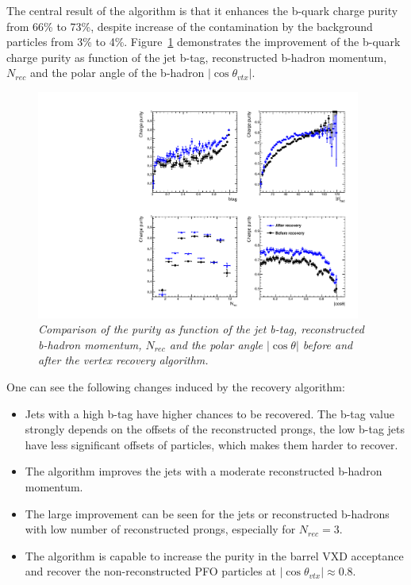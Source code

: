 The central result of the algorithm is that it enhances the b-quark charge purity from 66\% to 73\%, despite increase of the contamination by the  background particles from 3\% to 4\%.
Figure~\ref{fig:RecoveryPurityComparison_3} demonstrates the improvement of the b-quark charge purity as function of the jet b-tag, reconstructed b-hadron momentum, $N_{rec}$ and the polar angle of the b-hadron  $|\cos\theta_{vtx}|$.
\begin{figure}
{\centering
    \includegraphics[width=0.95\textwidth]{ILD/plots/recovery-purity-comparison.pdf}
    \caption{\sl Comparison of the purity as function of the jet b-tag, reconstructed b-hadron momentum, $N_{rec}$ and the polar angle $|\cos\theta|$ before and after the vertex recovery algorithm.  
    }
    \label{fig:RecoveryPurityComparison_3}
  }
\end{figure}
One can see the following changes induced by the recovery algorithm:
\begin{itemize}
\item Jets with a high b-tag have higher chances to be recovered. The b-tag value strongly depends on the offsets of the reconstructed prongs, the low b-tag jets have less significant offsets of particles, which makes them  harder to recover. 
\item The algorithm improves the jets with a moderate reconstructed b-hadron momentum. %
\item The large improvement can be seen for the jets or reconstructed b-hadrons with low number of reconstructed prongs, especially for $N_{rec}=3$.%
\item The algorithm is capable to increase the purity in the barrel VXD acceptance and recover the non-reconstructed PFO particles at $|\cos\theta_{vtx}| \approx 0.8$. 
\end{itemize}

